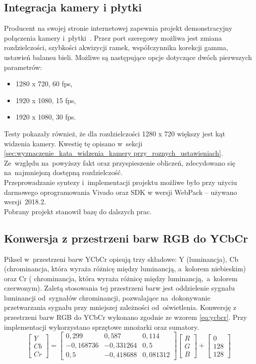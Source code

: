 \subsection{Integracja kamery i płytki}
\label{sec:integracja_uklad_kamera}
Producent na swojej stronie internetowej zapewnia projekt demonstracyjny połączenia kamery i~płytki~\cite{projektPCAM}. Przez port szeregowy możliwa jest zmiana rozdzielczości, szybkości akwizycji ramek, współczynnika korekcji gamma, ustawień balansu bieli. Możliwe są następujące opcje dotyczące dwóch pierwszych parametrów:
\begin{itemize}
	\item 1280 x 720, 60 fps,
	\item 1920 x 1080, 15 fps,
	\item 1920 x 1080, 30 fps.
\end{itemize}
Testy pokazały również, że dla rozdzielczości 1280 x 720 większy jest kąt widzenia kamery. Kwestię tę opisano w~sekcji \ref{sec:wyznaczenie_kata_widzenia_kamery przy_roznych_ustawieniach}. Ze~względu na~powyższy fakt oraz przyspieszenie obliczeń, zdecydowano się na~najmniejszą dostępną rozdzielczość.\\
Przeprowadzanie syntezy i~implementacji projektu możliwe było przy użyciu darmowego oprogramowania Vivado oraz SDK w wersji WebPack -- używano wersji~2018.2. \\
Pobrany projekt stanowił bazę do dalszych prac.
\subsection{Konwersja z przestrzeni barw RGB do YCbCr}
\label{subsec:konwersja}

Piksel w~przestrzeni barw YCbCr opisują trzy składowe: Y (luminancja), Cb (chrominancja, która wyraża różnicę między luminancją, a~kolorem niebieskim) oraz Cr ( chrominancja, która wyraża różnicę między luminancją,~a~kolorem czerwonym). 
Zaletą stosowania tej przestrzeni barw jest oddzielenie sygnału luminancji od~sygnałów chrominancji, pozwalające na~dokonywanie przetwarzania sygnału przy mniejszej zależności od~oświetlenia.
Konwersję z przestrzeni barw RGB do YCbCr wykonano zgodnie ze wzorem \ref{eq:ycbcr}. 
Przy implementacji wykorzystano sprzętowe mnożarki oraz sumatory.
\begin{equation}
\label{eq:ycbcr}
\begin{bmatrix} Y \\ 
Cb\\
Cr
\end{bmatrix}=
\begin{bmatrix} 0,299 & 0,587 & 0,114\\ 
-0,168736 & -0,331264 & 0,5\\
0,5 & -0,418688 & 0,081312
\end{bmatrix}
\begin{bmatrix} R\\
G\\
B
\end{bmatrix}+
\begin{bmatrix} 0\\
128\\
128
\end{bmatrix}
\end{equation}

